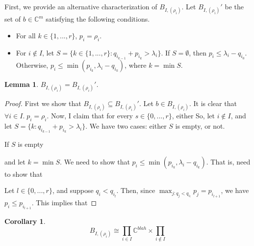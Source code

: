 \documentclass[12pt,psamsfonts]{article}
\newtheorem{lemma}[theorem]{Lemma}
\newtheorem{corollary}[theorem]{Corollary}
\begin{document}
\par First, we provide an alternative characterization of \(B_{I, (\rho_i)}\).
Let \(B_{I, (\rho_i)}'\) be the set of \(b \in \mathbb{C}^m\) satisfying the following conditions.
\begin{itemize}
    \item For all \(k \in \{1, ..., r\}\), \(p_i = \rho_i\).
    \item For \(i \notin I\), let \(S = \{k \in \{1, ..., r\} : q_{i_{k - 1}} + p_{i_k} > \lambda_i\}\).
    If \(S = \emptyset\), then \(p_i \leq \lambda_i - q_{i_0}\).
    Otherwise, \(p_i \leq \min(p_{i_k}, \lambda_i - q_{i_k})\), where \(k = \min S\).
\end{itemize}
\begin{lemma}\label{alternative_bs}
    \(B_{I, (\rho_i)} = B_{I, (\rho_i)}'\).
\end{lemma}
\begin{proof}
    First we show that \(B_{I, (\rho_i)} \subseteq B_{I, (\rho_i)}'\).
    Let \(b \in B_{I, (\rho_i)}\).
    It is clear that \(\forall i \in I. \; p_i = \rho_i\).
    Now, I claim that for every \(s \in \{0, ..., r\}\), either 
    So, let \(i \notin I\), and let \(S = \{k : q_{i_{k - 1}} + p_{i_k} > \lambda_i\}\).
    We have two cases: either \(S\) is empty, or not.
    \par If \(S\) is empty

    and let \(k = \min S\).
    We need to show that \(p_i \leq \min(p_{i_k}, \lambda_i - q_{i_k})\).
    That is, need to show that \(\)
    \par Let \(l \in \{0, ..., r\}\), and suppose \(q_i < q_{i_l}\).
    Then, since \(\max_{j : q_j < q_{i_l}} p_j = p_{i_{l + 1}}\), we have \(p_i \leq p_{i_{l + 1}}\).
    This implies that 
\end{proof}

\begin{corollary}\label{bs_iso}
    \[B_{I, (\rho_i)} \cong \prod_{i \in I} \mathbb{C}^{blah} \times \prod_{i \notin I}\]
\end{corollary}
\end{document}
